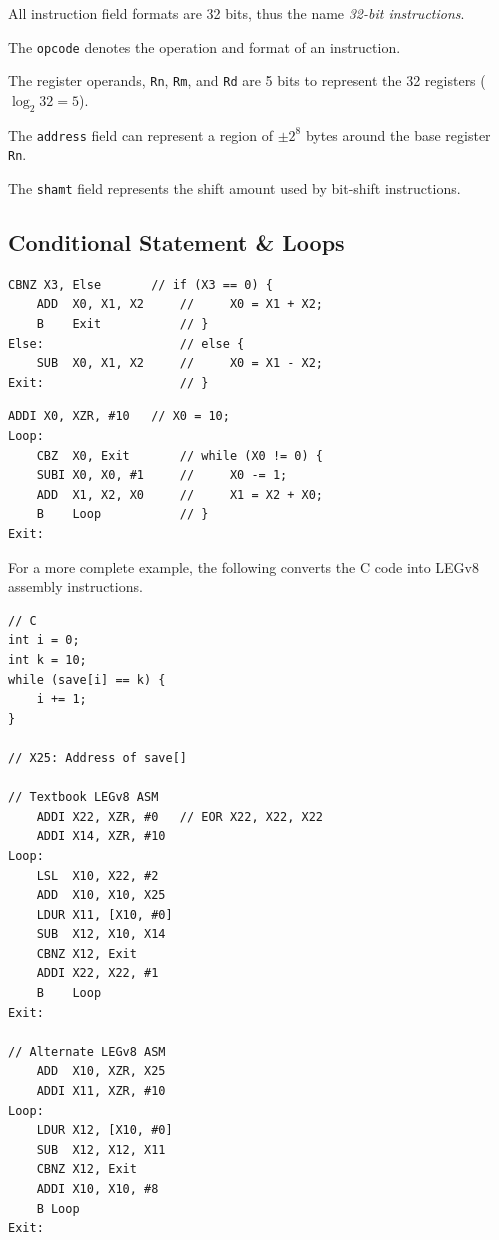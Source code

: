 \documentclass[11pt]{article}
\begin{document}
All instruction field formats are 32 bits, thus the name \textit{32-bit instructions}.

The \texttt{opcode} denotes the operation and format of an instruction.

The register operands, \texttt{Rn}, \texttt{Rm}, and \texttt{Rd} are 5 bits to represent the 32 registers ($\log_2{32}=5$).

The \texttt{address} field can represent a region of $\pm2^8$ bytes around the base register \texttt{Rn}.

The \texttt{shamt} field represents the shift amount used by bit-shift instructions.

\subsection*{Conditional Statement \& Loops}

\begin{lstlisting}[caption={Simple conditional statement implementation}]
    CBNZ X3, Else       // if (X3 == 0) {
    ADD  X0, X1, X2     //     X0 = X1 + X2;
    B    Exit           // }
Else:                   // else {
    SUB  X0, X1, X2     //     X0 = X1 - X2;
Exit:                   // }
\end{lstlisting}


\begin{lstlisting}[caption={Simple while loop implementation}]
    ADDI X0, XZR, #10   // X0 = 10;
Loop:
    CBZ  X0, Exit       // while (X0 != 0) {
    SUBI X0, X0, #1     //     X0 -= 1;
    ADD  X1, X2, X0     //     X1 = X2 + X0;
    B    Loop           // }
Exit:
\end{lstlisting}

For a more complete example, the following converts the C code into LEGv8 assembly instructions.

\begin{lstlisting}[caption={C code loop into LEGv8 ASM}]
// C
int i = 0;
int k = 10;
while (save[i] == k) {
    i += 1;
}

// X25: Address of save[]

// Textbook LEGv8 ASM
    ADDI X22, XZR, #0   // EOR X22, X22, X22
    ADDI X14, XZR, #10
Loop:
    LSL  X10, X22, #2
    ADD  X10, X10, X25
    LDUR X11, [X10, #0]
    SUB  X12, X10, X14
    CBNZ X12, Exit
    ADDI X22, X22, #1
    B    Loop
Exit:

// Alternate LEGv8 ASM
    ADD  X10, XZR, X25
    ADDI X11, XZR, #10
Loop:
    LDUR X12, [X10, #0]
    SUB  X12, X12, X11
    CBNZ X12, Exit
    ADDI X10, X10, #8
    B Loop
Exit:
\end{lstlisting}
\end{document}
